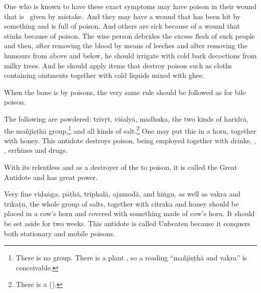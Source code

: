 \begin{translation}
\item[58.1--60]

\begin{sloka}
    
    One who is known to have these exact symptoms may have poison
    in their wound  that is \dag\ given by mistake.\dag\ And they may have 
    a wound that  has been hit by something
     and is full of poison. And others
    are sick because of a wound that stinks because of poison.  
    The wise person debrides the excess flesh of such people and then, after
    removing the blood by means of leeches and after removing the
    humours from above and below, he should irrigate with cold bark
    decoctions from milky trees.   And he should apply items that destroy poison 
    such as cloths containing 
    ointments together with cold liquids mixed with ghee.
        
\end{sloka}
    
\item[61ab]    

\begin{sloka}
    When the bone is  by poisons, the very same rule should be 
    followed as for bile poison.

\item[61cd--63ab] The following are powdered: %
\gls{trivṛt}, \gls{viśalyā}, \gls{madhuka}, the two kinds of \gls{haridrā}, the
\gls{mañjiṣṭhā} group,\footnote{There is no  group. There is a
    plant , so a reading  “\gls{mañjiṣṭhā} and
    \gls{vakra}” is conceivable.} and all kinds of salt.\footnote{There is a
         ().} One may put this in 
        a horn,
        together with honey.   This antidote destroys poison, being employed 
        together
        with drinks, , , errhines 
        and
        drugs.

With its relentless  and as a destroyer of the
 to poison, it is called the Great Antidote and has
great power.
\end{sloka} 




\item[63cd--65ab]

Very fine \gls{viḍaṅga}, \gls{pāṭhā}, \gls{triphalā}, \gls{ajamodā}, and
\gls{hiṅgu}, as well as \gls{vakra} and \gls{trikaṭu}, the whole group of salts,
together with \gls{citraka} and honey should be placed in a cow's horn and 
covered with something made of cow's horn.  It should be set aside for two 
weeks.
%
This antidote is called Unbeaten because it conquers  both stationary and 
mobile poisons. 


\end{translation}
